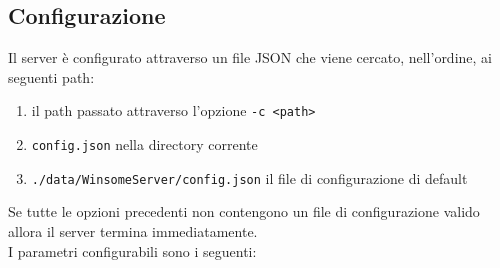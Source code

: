 \subsection{Configurazione}
Il server è configurato attraverso un file JSON che viene cercato, nell'ordine, ai seguenti path:
\begin{enumerate}
	\item il path passato attraverso l'opzione \verb|-c <path>|
	\item \verb|config.json| nella directory corrente
	\item \verb|./data/WinsomeServer/config.json| il file di configurazione di default
\end{enumerate}
Se tutte le opzioni precedenti non contengono un file di configurazione valido allora il server termina immediatamente.\\
I parametri configurabili sono i seguenti:
